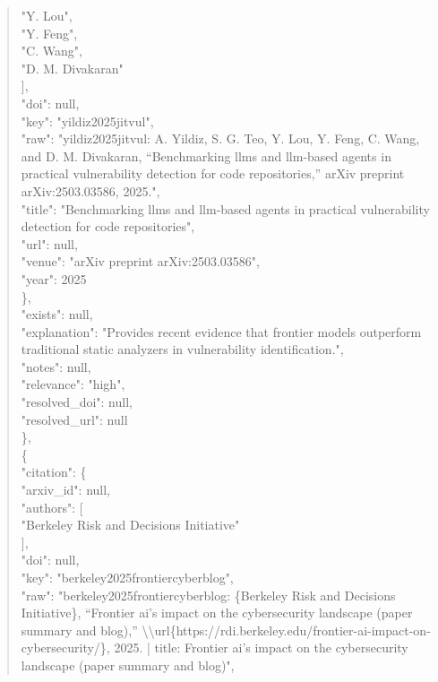 \documentclass[11pt]{article}
\begin{document}
\begin{quote}
          "Y. Lou",\\
          "Y. Feng",\\
          "C. Wang",\\
          "D. M. Divakaran"\\
        ],\\
        "doi": null,\\
        "key": "yildiz2025jitvul",\\
        "raw": "yildiz2025jitvul: A. Yildiz, S. G. Teo, Y. Lou, Y. Feng, C. Wang, and D. M. Divakaran, ``Benchmarking llms and llm-based agents in practical vulnerability detection for code repositories,'' arXiv preprint arXiv:2503.03586, 2025.",\\
        "title": "Benchmarking llms and llm-based agents in practical vulnerability detection for code repositories",\\
        "url": null,\\
        "venue": "arXiv preprint arXiv:2503.03586",\\
        "year": 2025\\
      \},\\
      "exists": null,\\
      "explanation": "Provides recent evidence that frontier models outperform traditional static analyzers in vulnerability identification.",\\
      "notes": null,\\
      "relevance": "high",\\
      "resolved\_doi": null,\\
      "resolved\_url": null\\
    \},\\
    \{\\
      "citation": \{\\
        "arxiv\_id": null,\\
        "authors": [\\
          "Berkeley Risk and Decisions Initiative"\\
        ],\\
        "doi": null,\\
        "key": "berkeley2025frontiercyberblog",\\
        "raw": "berkeley2025frontiercyberblog: \{Berkeley Risk and Decisions Initiative\}, ``Frontier ai's impact on the cybersecurity landscape (paper summary and blog),'' \textbackslash{}\textbackslash{}url\{https://rdi.berkeley.edu/frontier-ai-impact-on-cybersecurity/\}, 2025. | title: Frontier ai's impact on the cybersecurity landscape (paper summary and blog)",\\

\end{quote}
\end{document}
